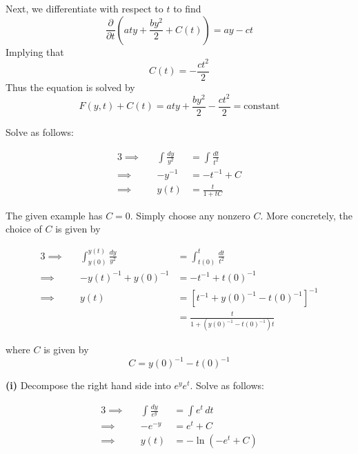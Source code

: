 \documentclass[a4paper]{article}
\begin{document}
Next, we differentiate with respect to \(t\) to find
\[
	\frac{\partial }{\partial t} \!\left( aty + \frac{by^{2}}{2} + C \!\left( t \right)  \right) = ay - ct
\]
Implying that
\[
	C \!\left( t \right) = -\frac{ct^{2}}{2}
\]
Thus the equation is solved by
\[
	F \!\left( y,t \right) + C \!\left( t \right) = aty + \frac{by^{2}}{2} - \frac{ct^{2}}{2} = \text{constant}
\]


Solve as follows:

\begin{alignat*}{3}
	\implies &&\int \frac{dy}{y^{2}} & = \int \frac{dt}{t^{2}} \\
	\implies && -y^{-1} & = -t^{-1} + C \\ 
	\implies && y \!\left( t \right) & = \frac{t}{1 + tC}
\end{alignat*}

The given example has \(C = 0\). Simply choose any nonzero \(C\). More concretely, the choice of \(C\) is given by

\begin{alignat*}{3}
	\implies &&\int^{y \!\left( t \right) }_{y \!\left( 0 \right) } \frac{dy}{y^{2}} & = \int^{t}_{t \!\left( 0 \right) } \frac{dt}{t^{2}}  \\
	\implies && -y \!\left( t \right)^{-1} + y \!\left( 0 \right)^{-1} & = -t^{-1} + t \!\left( 0 \right)^{-1} \\ 
	\implies && y \!\left( t \right) & = \left[ t^{-1} + y \!\left( 0 \right)^{-1} - t \!\left( 0 \right)^{-1} \right]^{-1} \\
		 && & = \frac{t}{1 + \!\left( y \!\left( 0 \right)^{-1} - t \!\left( 0 \right)^{-1} \right) t}
\end{alignat*}

where \(C\) is given by
\[
	C = y \!\left( 0 \right)^{-1} - t \!\left( 0 \right)^{-1}
\]


\textbf{(i)} Decompose the right hand side into \(e^{y}e^{t}\). Solve as follows:

\begin{alignat*}{3}
	\implies &&\int \frac{dy}{e^{y}} & = \int e^{t} \, dt \\
	\implies && -e^{-y} & = e^{t} + C \\ 
	\implies && y \!\left( t \right) & = -\ln\left( -e^{t} + C \right) 
\end{alignat*}
\end{document}
